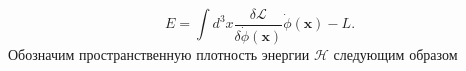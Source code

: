 \documentclass[a4paper]{article}
\begin{document}
\begin{sol}
	\[
		E=\int d^3 x \frac{\delta \mathcal{L}}{\delta \dot{\phi}(\mathbf{x})}
		\dot{\phi}(\mathbf{x})-L
	.\] 
% 
	Обозначим пространственную плотность энергии $\mathcal{H}$ следующим образом

\end{sol}
\end{document}

